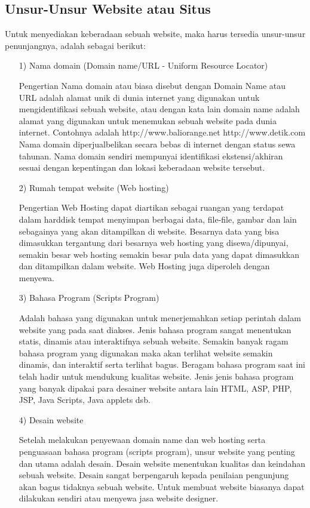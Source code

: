 \documentclass{jtetiproposalskripsi}
\begin{document}
\subsection{Unsur-Unsur Website atau Situs}
Untuk menyediakan keberadaan sebuah website, maka harus tersedia unsur-unsur penunjangnya, adalah sebagai berikut:
\begin{itemize}
\item[1)]Nama domain (Domain name/URL - Uniform Resource Locator)

Pengertian Nama domain atau biasa disebut dengan Domain Name atau URL adalah alamat unik di dunia internet yang digunakan untuk mengidentifikasi sebuah website, atau dengan kata lain domain name adalah alamat yang digunakan untuk menemukan sebuah website pada dunia internet. Contohnya adalah http://www.baliorange.net http://www.detik.com
Nama domain diperjualbelikan secara bebas di internet dengan status sewa tahunan. Nama domain sendiri mempunyai identifikasi ekstensi/akhiran sesuai dengan kepentingan dan lokasi keberadaan website tersebut.

\item[2)]Rumah tempat website (Web hosting) 

Pengertian Web Hosting dapat diartikan sebagai ruangan yang terdapat dalam harddisk tempat menyimpan berbagai data, file-file, gambar dan lain sebagainya yang akan ditampilkan di website. Besarnya data yang bisa dimasukkan tergantung dari besarnya web hosting yang disewa/dipunyai, semakin besar web hosting semakin besar pula data yang dapat dimasukkan dan ditampilkan dalam website. Web Hosting juga diperoleh dengan menyewa. 

\item[3)]Bahasa Program (Scripts Program)  

Adalah bahasa yang digunakan untuk menerjemahkan setiap perintah dalam website yang pada saat diakses. Jenis bahasa program sangat menentukan statis, dinamis atau interaktifnya sebuah website. Semakin banyak ragam bahasa program yang digunakan maka akan terlihat website semakin dinamis, dan interaktif serta terlihat bagus. Beragam bahasa program saat ini telah hadir untuk mendukung kualitas website. Jenis jenis bahasa program yang banyak dipakai para desainer website antara lain HTML, ASP, PHP, JSP, Java Scripts, Java applets dsb. 

\item[4)]Desain website

Setelah melakukan penyewaan domain name dan web hosting serta penguasaan bahasa program (scripts program), unsur website yang penting dan utama adalah desain. Desain website menentukan kualitas dan keindahan sebuah website. Desain sangat berpengaruh kepada penilaian pengunjung akan bagus tidaknya sebuah website. Untuk membuat website biasanya dapat dilakukan sendiri atau menyewa jasa website designer. 
\end{itemize}
\end{document}
